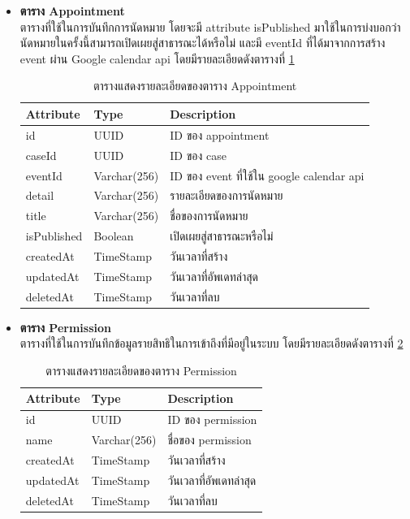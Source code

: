 \documentclass[12pt,oneside,openright,a4paper]{cpe-thai-project}
\begin{document}
\begin{itemize}
\newpage
\item \textbf{ตาราง Appointment}\\
ตารางที่ใช้ในการบันทึกการนัดหมาย โดยจะมี attribute isPublished มาใช้ในการบ่งบอกว่า นัดหมายในครั้งนี้สามารถเปิดเผยสู่สาธารณะได้หรือไม่ และมี eventId ที่ได้มาจากการสร้าง event ผ่าน Google calendar api โดยมีรายละเอียดดังตารางที่  \ref{tbl:dbAppointment}
\begin{table}[!ht]
    \centering
    \begin{tabular}{|p{4cm}|p{2cm}|p{6cm}|}
    \hline
    \textbf{Attribute} & \textbf{Type} & \textbf{Description}   \\ \hline
    id          & UUID        & ID ของ appointment                        \\ \hline
    caseId      & UUID        & ID ของ case                               \\ \hline
    eventId     & Varchar(256) & ID ของ event ที่ใช้ใน google calendar api \\ \hline
    detail      & Varchar(256) & รายละเอียดของการนัดหมาย                   \\ \hline
    title       & Varchar(256) & ชื่อของการนัดหมาย                         \\ \hline
    isPublished & Boolean        & เปิดเผยสู่สาธารณะหรือไม่                  \\ \hline
    createdAt   & TimeStamp   & วันเวลาที่สร้าง                           \\ \hline
    updatedAt   & TimeStamp   & วันเวลาที่อัพเดทล่าสุด                    \\ \hline
    deletedAt   & TimeStamp   & วันเวลาที่ลบ             \\ \hline
    \end{tabular}
    \caption{\centering  ตารางแสดงรายละเอียดของตาราง Appointment} \label{tbl:dbAppointment}
\end{table}


\item \textbf{ตาราง Permission}\\
ตารางที่ใช้ในการบันทึกข้อมูลรายสิทธิในการเข้าถึงที่มีอยู่ในระบบ โดยมีรายละเอียดดังตารางที่ \ref{tbl:dbPermission}
\begin{table}[!ht]
    \centering
    \begin{tabular}{|p{4cm}|p{2cm}|p{6cm}|}
    \hline
    \textbf{Attribute} & \textbf{Type} & \textbf{Description}   \\ \hline
    id        & UUID        & ID ของ permission      \\ \hline
    name      & Varchar(256) & ชื่อของ permission     \\ \hline
    createdAt & TimeStamp   & วันเวลาที่สร้าง        \\ \hline
    updatedAt & TimeStamp   & วันเวลาที่อัพเดทล่าสุด \\ \hline
    deletedAt & TimeStamp   & วันเวลาที่ลบ                \\ \hline
    \end{tabular}
    \caption{\centering  ตารางแสดงรายละเอียดของตาราง Permission} \label{tbl:dbPermission}
\end{table}


\end{itemize}
\end{document}
